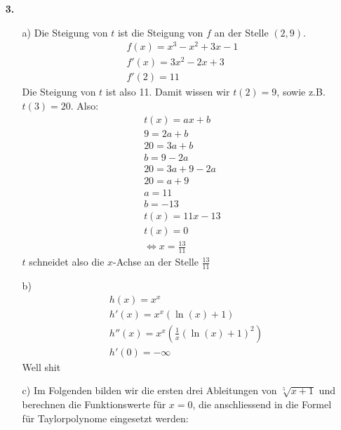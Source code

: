 \documentclass[a4paper,11pt]{article}
\begin{document}
\begin{enumerate}
        \item[\textbf{3.}]
            \begin{enumerate}
                \item[a)]
                    Die Steigung von $t$ ist die Steigung von $f$ an der Stelle $(2,9)$.
                    \begin{align*}
                        f(x)=x^3-x^2+3x-1\\
                        f'(x)=3x^2-2x+3\\
                        f'(2)=11
                    \end{align*}
                    Die Steigung von $t$ ist also 11. Damit wissen wir $t(2)=9$, sowie z.B. $t(3)=20$. Also:
                    \begin{align*}
                        t(x)=ax+b\\
                        9=2a+b\\
                        20=3a+b\\
                        b=9-2a\\
                        20=3a+9-2a\\
                        20=a+9\\
                        a=11\\
                        b=-13\\
                        t(x)=11x-13\\
                        t(x)=0\\
                        \Leftrightarrow x=\frac{13}{11}
                    \end{align*}
                    $t$ schneidet also die $x$-Achse an der Stelle $\frac{13}{11}$
                \item[b)]
                    \begin{align*}
                        &h(x)=x^x\\
                        &h'(x)=x^x (\ln(x)+1)\\
                        &h''(x)=x^x \left( \frac{1}{x} (\ln(x)+1)^2 \right)\\
                        &h'(0)=- \infty
                    \end{align*}
                    Well shit
                \item[c)]
                    Im Folgenden bilden wir die ersten drei Ableitungen von $\sqrt[5]{x+1}$ und berechnen die Funktionswerte für $x = 0$,
                    die anschliessend in die Formel für Taylorpolynome eingesetzt werden:

\end{enumerate}
\end{enumerate}
\end{document}
